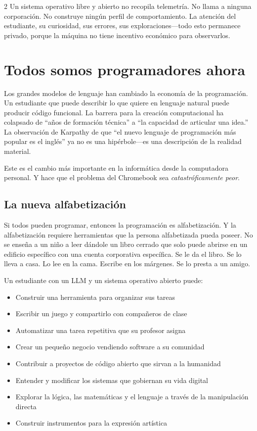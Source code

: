 \documentclass[11pt, a4paper]{article}
\begin{document}
\begin{multicols}{2}
Un sistema operativo libre y abierto no recopila telemetría. No llama a ninguna corporación. No construye ningún perfil de comportamiento. La atención del estudiante, su curiosidad, sus errores, sus exploraciones---todo esto permanece privado, porque la máquina no tiene incentivo económico para observarlos.


\section{Todos somos programadores ahora}

Los grandes modelos de lenguaje han cambiado la economía de la programación. Un estudiante que puede describir lo que quiere en lenguaje natural puede producir código funcional. La barrera para la creación computacional ha colapsado de ``años de formación técnica'' a ``la capacidad de articular una idea.'' La observación de Karpathy de que ``el nuevo lenguaje de programación más popular es el inglés'' ya no es una hipérbole---es una descripción de la realidad material.

Este es el cambio más importante en la informática desde la computadora personal. Y hace que el problema del Chromebook sea \emph{catastróficamente peor}.

\subsection{La nueva alfabetización}

Si todos pueden programar, entonces la programación es alfabetización. Y la alfabetización requiere herramientas que la persona alfabetizada pueda poseer. No se enseña a un niño a leer dándole un libro cerrado que solo puede abrirse en un edificio específico con una cuenta corporativa específica. Se le da el libro. Se lo lleva a casa. Lo lee en la cama. Escribe en los márgenes. Se lo presta a un amigo.

Un estudiante con un LLM y un sistema operativo abierto puede:

\begin{itemize}
  \item Construir una herramienta para organizar sus tareas
  \item Escribir un juego y compartirlo con compañeros de clase
  \item Automatizar una tarea repetitiva que su profesor asigna
  \item Crear un pequeño negocio vendiendo software a su comunidad
  \item Contribuir a proyectos de código abierto que sirvan a la humanidad
  \item Entender y modificar los sistemas que gobiernan su vida digital
  \item Explorar la lógica, las matemáticas y el lenguaje a través de la manipulación directa
  \item Construir instrumentos para la expresión artística
\end{itemize}


\end{multicols}
\end{document}
